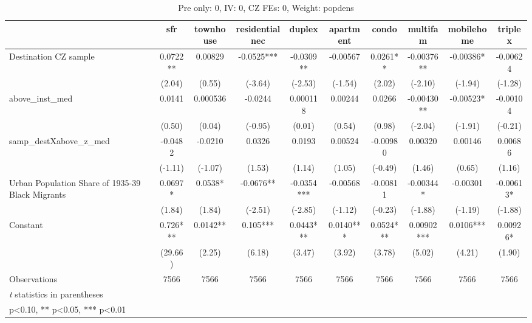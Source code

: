 \begin{table}[htbp]\centering
\def\sym#1{\ifmmode^{#1}\else\(^{#1}\)\fi}
\caption{Pre only: 0, IV: 0, CZ FEs: 0, Weight: popdens}
\begin{tabular}{l*{9}{c}}
\toprule
                    &\multicolumn{1}{c}{sfr}&\multicolumn{1}{c}{townhouse}&\multicolumn{1}{c}{residentialnec}&\multicolumn{1}{c}{duplex}&\multicolumn{1}{c}{apartment}&\multicolumn{1}{c}{condo}&\multicolumn{1}{c}{multifam}&\multicolumn{1}{c}{mobilehome}&\multicolumn{1}{c}{triplex}\\
\midrule
Destination CZ sample&      0.0722** &     0.00829   &     -0.0525***&     -0.0309** &    -0.00567   &      0.0261** &    -0.00376** &    -0.00386*  &    -0.00624   \\
                    &      (2.04)   &      (0.55)   &     (-3.64)   &     (-2.53)   &     (-1.54)   &      (2.02)   &     (-2.10)   &     (-1.94)   &     (-1.28)   \\
\addlinespace
above\_inst\_med      &      0.0141   &    0.000536   &     -0.0244   &    0.000118   &     0.00244   &      0.0266   &    -0.00430** &    -0.00523*  &    -0.00104   \\
                    &      (0.50)   &      (0.04)   &     (-0.95)   &      (0.01)   &      (0.54)   &      (0.98)   &     (-2.04)   &     (-1.91)   &     (-0.21)   \\
\addlinespace
samp\_destXabove\_z\_med&     -0.0482   &     -0.0210   &      0.0326   &      0.0193   &     0.00524   &    -0.00980   &     0.00320   &     0.00146   &     0.00686   \\
                    &     (-1.11)   &     (-1.07)   &      (1.53)   &      (1.14)   &      (1.05)   &     (-0.49)   &      (1.46)   &      (0.65)   &      (1.16)   \\
\addlinespace
Urban Population Share of 1935-39 Black Migrants&      0.0697*  &      0.0538*  &     -0.0676** &     -0.0354***&    -0.00568   &    -0.00811   &    -0.00344*  &    -0.00301   &    -0.00613*  \\
                    &      (1.84)   &      (1.84)   &     (-2.51)   &     (-2.85)   &     (-1.12)   &     (-0.23)   &     (-1.88)   &     (-1.19)   &     (-1.88)   \\
\addlinespace
Constant            &       0.726***&      0.0142** &       0.105***&      0.0443***&      0.0140***&      0.0524***&     0.00902***&      0.0106***&     0.00926*  \\
                    &     (29.66)   &      (2.25)   &      (6.18)   &      (3.47)   &      (3.92)   &      (3.78)   &      (5.02)   &      (4.21)   &      (1.90)   \\
\midrule
Observations        &        7566   &        7566   &        7566   &        7566   &        7566   &        7566   &        7566   &        7566   &        7566   \\
\bottomrule
\multicolumn{10}{l}{\footnotesize \textit{t} statistics in parentheses}\\
\multicolumn{10}{l}{\footnotesize * p<0.10, ** p<0.05, *** p<0.01}\\
\end{tabular}
\end{table}
